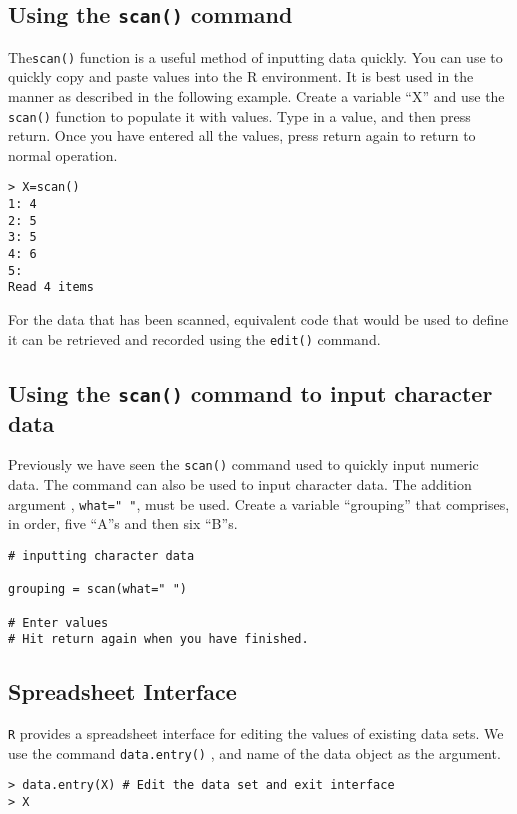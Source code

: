 \documentclass[a4paper,12pt]{article}
\begin{document}
\subsection{ Using the \texttt{scan()} command}
The\texttt{scan()}  function is a useful method of inputting data quickly. You can use to quickly copy and paste values into the R environment.
It is best used in the manner as described in the following example.  Create a variable “X” and use the \texttt{scan()}  function to populate it with values.
Type in a value, and then press return.
Once you have entered all the values, press return again to return to normal operation.
\begin{verbatim}
> X=scan()
1: 4
2: 5
3: 5
4: 6
5: 
Read 4 items
\end{verbatim}
For the data that has been scanned,  equivalent code that would be used to define it can be retrieved and recorded using the \texttt{edit()} command. 
\subsection{Using the \texttt{scan()} command to input character data}
Previously we have seen the \texttt{scan()} command used to quickly input numeric data. The command can also be used to input character data. The addition argument , \texttt{what=" "}, must be used.  
Create a variable “grouping” that comprises, in order,  five “A”s and then six “B”s.

\begin{verbatim}
# inputting character data

grouping = scan(what=" ")

# Enter values
# Hit return again when you have finished.

\end{verbatim}


\subsection{Spreadsheet Interface}
\texttt{R} provides a spreadsheet interface for editing the values of existing data sets.
We use the command \texttt{data.entry()} , and name of the data object as the argument.

\begin{verbatim}
> data.entry(X) # Edit the data set and exit interface
> X
\end{verbatim}


\end{document}
